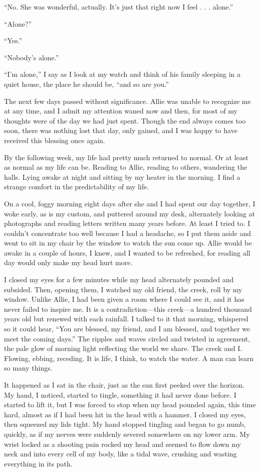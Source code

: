 \documentclass[10pt, twoside, openright]{book}
\begin{document}
``No. She was wonderful, actually. It's just that right now I feel . . . alone.''


``Alone?''

``Yes.''

``Nobody's alone.''


``I'm alone,'' I say as I look at my watch and think of his family
sleeping in a quiet house, the place he should be, ``and so are you.''

The next few days passed without significance. Allie was unable to
recognize me at any time, and I admit my attention waned now and then,
for most of my thoughts were of the day we had just spent. Though the
end always comes too soon, there was nothing lost that day, only gained,
and I was happy to have received this blessing once again.

By the following week, my life had pretty much returned to normal. Or at
least as normal as my life can be. Reading to Allie, reading to others,
wandering the halls. Lying awake at night and sitting by my heater in
the morning. I find a strange comfort in the predictability of my life.

On a cool, foggy morning eight days after she and I had spent our day
together, I woke early, as is my custom, and puttered around my desk,
alternately looking at photographs and reading letters written many
years before. At least I tried to. I couldn't concentrate too well
because I had a headache, so I put them aside and went to sit in my
chair by the window to watch the sun come up. Allie would be awake in a
couple of hours, I knew, and I wanted to be refreshed, for reading all
day would only make my head hurt more.

I closed my eyes for a few minutes while my head alternately pounded and
subsided. Then, opening them, I watched my old friend, the creek, roll
by my window. Unlike Allie, I had been given a room where I could see
it, and it has never failed to inspire me. It is a contradiction---this
creek---a hundred thousand years old but renewed with each rainfall. I
talked to it that morning, whispered so it could hear, ``You are
blessed, my friend, and I am blessed, and together we meet the coming
days.'' The ripples and waves circled and twisted in agreement, the pale
glow of morning light reflecting the world we share. The creek and I.
Flowing, ebbing, receding. It is life, I think, to watch the water. A
man can learn so many things.

It happened as I sat in the chair, just as the sun first peeked over the
horizon. My hand, I noticed, started to tingle, something it had never
done before. I started to lift it, but I was forced to stop when my head
pounded again, this time hard, almost as if I had been hit in the head
with a hammer. I closed my eyes, then squeezed my lids tight. My hand
stopped tingling and began to go numb, quickly, as if my nerves were
suddenly severed somewhere on my lower arm. My wrist locked as a
shooting pain rocked my head and seemed to flow down my neck and into
every cell of my body, like a tidal wave, crushing and wasting
everything in its path.
\end{document}

